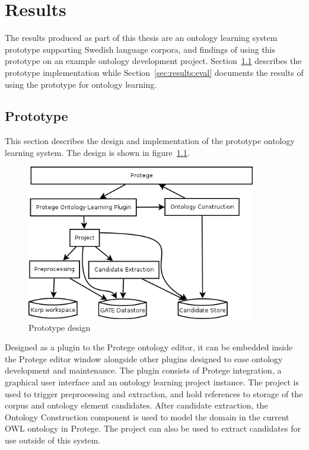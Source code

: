 \documentclass[a4paper]{report}
\begin{document}
\chapter{Results}

The results produced as part of this thesis are an ontology learning system prototype supporting Swedish language corpora, and findings of using this prototype on an example ontology development project.
Section~\ref{sec:results:prototype} describes the prototype implementation while Section~\ref{sec:results:eval} documents the results of using the prototype for ontology learning.

\section{Prototype}
\label{sec:results:prototype}
This section describes the design and implementation of the prototype ontology learning system.
The design is shown in figure~\ref{fig:prototype-design}.

\begin{figure}
  \includegraphics[width=10cm]{graphics/protege-plugin-components-simple.png}
  \caption{Prototype design}
  \label{fig:prototype-design}
\end{figure}

Designed as a plugin to the Protege ontology editor, it can be embedded inside the Protege editor window alongside other plugins designed to ease ontology development and maintenance.
The plugin consists of Protege integration, a graphical user interface and an ontology learning project instance.
The project is used to trigger preprocessing and extraction, and hold references to storage of the corpus and ontology element candidates. After candidate extraction, the Ontology Construction component is used to model the domain in the current OWL ontology in Protege. The project can also be used to extract candidates for use outside of this system.
\end{document}

